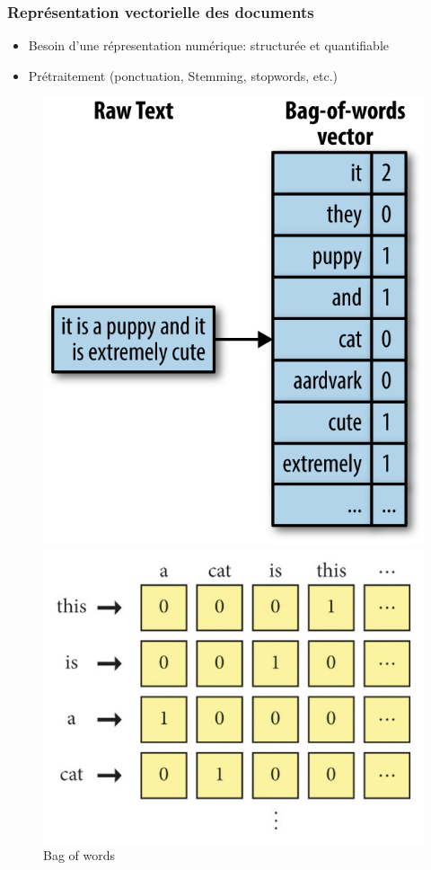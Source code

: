 \documentclass{beamer}
\begin{document}
\begin{frame}
\frametitle{Représentation vectorielle des documents}
\begin{itemize}
    \item Besoin d'une répresentation numérique: structurée et quantifiable 
    \item Prétraitement (ponctuation, Stemming, stopwords, etc.)
\end{itemize}

\begin{figure}
    \begin{minipage}[b]{0.40\textwidth}
        \centering
        \includegraphics[width=\textwidth]{bag_words.jpeg} 
        \caption{Bag of words}
    \end{minipage}
    \hfill
    \begin{minipage}[b]{0.45\textwidth}
        \centering
        \includegraphics[width=\textwidth]{ohe.png}

\end{minipage}
\end{figure}
\end{frame}
\end{document}
